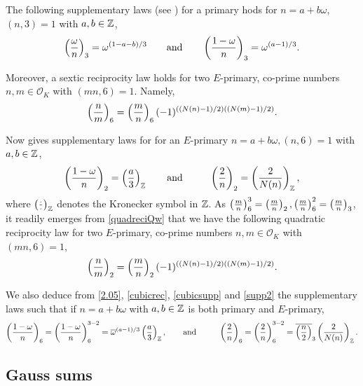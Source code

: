 \documentclass[twoside,leqno,10pt, A4]{amsart}
\begin{document}
The following supplementary laws (see \cite[Theorem 7.8]{Lemmermeyer}) for a primary hods for $n=a+b\omega$, $(n,3)=1$ with $a, b \in \mathbb Z$,
\begin{align}
\label{cubicsupp}
  \left(\frac{\omega}{n}\right)_3=\omega^{(1-a-b)/3} \qquad \mbox{and} \qquad \left(\frac{1-\omega}{n}\right)_3=\omega^{(a-1)/3}.
\end{align}

Moreover, a sextic reciprocity law holds for two $E$-primary, co-prime numbers $n, m \in \mathcal O_K$ with $(mn, 6)=1$.  Namely,
\begin{align}
\label{quadreciQw}
    \left(\frac{n}{m}\right)_6 =\left(\frac{m}{n}\right)_6(-1)^{((N(n)-1)/2)((N(m)-1)/2)}.
\end{align}

Now \cite[Theorem 7.10]{Lemmermeyer} gives supplementary laws for for an $E$-primary $n=a+b\omega, (n,6)=1$ with $a, b \in
\mathbb Z$,
\begin{align}
\label{supp2}
  \left(\frac{1-\omega}{n}\right)_2=\left(\frac{a}{3}\right)_{\mathbb Z} \qquad \mbox{and} \qquad  \hspace{0.1in} \left(\frac{2}{n}\right)_2=\left(\frac{2}{N(n)}\right)_{\mathbb Z},
\end{align}
  where $\left(\frac{\cdot}{\cdot}\right)_{\mathbb Z}$ denotes the Kronecker symbol in $\mathbb Z$.  As $\left(\frac{m}{n}\right)^3_6=\left(\frac{m}{n}\right)_2,
\left(\frac{m}{n}\right)^2_6=\left(\frac{m}{n}\right)_3$, it readily emerges from \eqref{quadreciQw} that we have the following quadratic reciprocity law for two $E$-primary, co-prime
numbers $n, m \in \mathcal O_K$ with $(mn, 6)=1$,
\begin{align}
\label{quadreci}
    \left(\frac{n}{m}\right)_2 =\left(\frac{m}{n}\right)_2(-1)^{((N(n)-1)/2)((N(m)-1)/2)}.
\end{align}

   We also deduce from \eqref{2.05}, \eqref{cubicrec}, \eqref{cubicsupp} and \eqref{supp2} the supplementary laws such that if $n=a+b\omega$
with $a, b \in \mathbb Z$ is both primary and $E$-primary,
\begin{align*}
  \left(\frac{1-\omega}{n}\right)_6=\left(\frac{1-\omega}{n}\right)^{3-2}_6=\overline{\omega}^{(a-1)/3}\left(\frac{a}{3}\right)_{\mathbb Z},  \qquad \mbox{and} \qquad  \hspace{0.1in} \left(\frac{2}{n}\right)_6=\left(\frac{2}{n}\right)^{3-2}_6=\overline{\left(\frac{n}{2}\right)}_{3} \left(\frac{2}{N(n)}\right)_{\mathbb Z}.
\end{align*}

\subsection{Gauss sums}
\label{section:Gauss}
\end{document}
